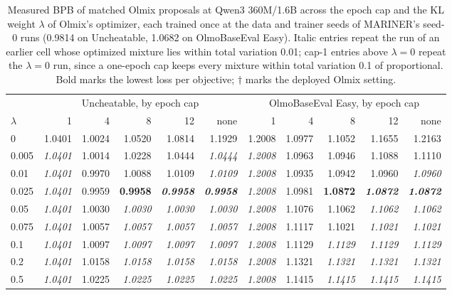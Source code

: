 \begin{table}[H]
\caption{Measured BPB of matched Olmix proposals at Qwen3 360M/1.6B across the epoch cap and the KL weight $\lambda$ of Olmix's optimizer, each trained once at the data and trainer seeds of MARINER's seed-0 runs (0.9814 on Uncheatable, 1.0682 on OlmoBaseEval Easy). Italic entries repeat the run of an earlier cell whose optimized mixture lies within total variation 0.01; cap-1 entries above $\lambda=0$ repeat the $\lambda=0$ run, since a one-epoch cap keeps every mixture within total variation 0.1 of proportional. Bold marks the lowest loss per objective; $\dagger$ marks the deployed Olmix setting.}
\label{tab:a-olmix-cap-kl}
\centering
\footnotesize
\setlength{\tabcolsep}{3pt}
\begin{tabular}{lrrrrrrrrrr}
\toprule
& \multicolumn{5}{c}{Uncheatable, by epoch cap} & \multicolumn{5}{c}{OlmoBaseEval Easy, by epoch cap} \\
\cmidrule(lr){2-6}\cmidrule(lr){7-11}
$\lambda$ & 1 & 4 & 8 & 12 & none & 1 & 4 & 8 & 12 & none \\
\midrule
0 & 1.0401 & 1.0024 & 1.0520 & 1.0814 & 1.1929 & 1.2008 & 1.0977 & 1.1052 & 1.1655 & 1.2163 \\
0.005 & \textit{1.0401} & 1.0014 & 1.0228 & 1.0444 & \textit{1.0444} & \textit{1.2008} & 1.0963\rlap{$^\dagger$} & 1.0946 & 1.1088 & 1.1110 \\
0.01 & \textit{1.0401} & 0.9970 & 1.0088 & 1.0109 & \textit{1.0109} & \textit{1.2008} & 1.0935 & 1.0942 & 1.0960 & \textit{1.0960} \\
0.025 & \textit{1.0401} & 0.9959 & \textbf{0.9958} & \textbf{\textit{0.9958}} & \textbf{\textit{0.9958}} & \textit{1.2008} & 1.0981 & \textbf{1.0872} & \textbf{\textit{1.0872}} & \textbf{\textit{1.0872}} \\
0.05 & \textit{1.0401} & 1.0030\rlap{$^\dagger$} & \textit{1.0030} & \textit{1.0030} & \textit{1.0030} & \textit{1.2008} & 1.1076 & 1.1062 & \textit{1.1062} & \textit{1.1062} \\
0.075 & \textit{1.0401} & 1.0057 & \textit{1.0057} & \textit{1.0057} & \textit{1.0057} & \textit{1.2008} & 1.1117 & 1.1021 & \textit{1.1021} & \textit{1.1021} \\
0.1 & \textit{1.0401} & 1.0097 & \textit{1.0097} & \textit{1.0097} & \textit{1.0097} & \textit{1.2008} & 1.1129 & \textit{1.1129} & \textit{1.1129} & \textit{1.1129} \\
0.2 & \textit{1.0401} & 1.0158 & \textit{1.0158} & \textit{1.0158} & \textit{1.0158} & \textit{1.2008} & 1.1321 & \textit{1.1321} & \textit{1.1321} & \textit{1.1321} \\
0.5 & \textit{1.0401} & 1.0225 & \textit{1.0225} & \textit{1.0225} & \textit{1.0225} & \textit{1.2008} & 1.1415 & \textit{1.1415} & \textit{1.1415} & \textit{1.1415} \\
\bottomrule
\end{tabular}
\end{table}
